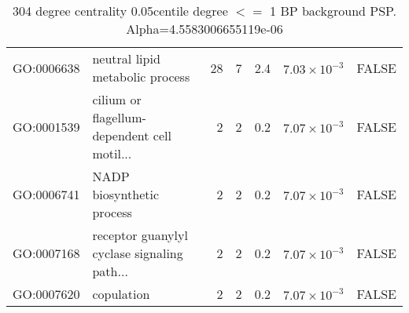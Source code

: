 \begin{table}[ht]
\begin{adjustbox}{max width=\textwidth}
\begin{tabular}{llrrrrl}
  GO:0006638 & neutral lipid metabolic process & 28 & 7 & 2.4 & $7.03 \times 10^{-3}$ & FALSE \\ 
  GO:0001539 & cilium or flagellum-dependent cell motil... & 2 & 2 & 0.2 & $7.07 \times 10^{-3}$ & FALSE \\ 
  GO:0006741 & NADP biosynthetic process & 2 & 2 & 0.2 & $7.07 \times 10^{-3}$ & FALSE \\ 
  GO:0007168 & receptor guanylyl cyclase signaling path... & 2 & 2 & 0.2 & $7.07 \times 10^{-3}$ & FALSE \\ 
  GO:0007620 & copulation & 2 & 2 & 0.2 & $7.07 \times 10^{-3}$ & FALSE \\ 
   \hline
\end{tabular}
\end{adjustbox}
\caption{304 degree centrality 0.05centile degree $<=$ 1 BP background PSP. Alpha=4.5583006655119e-06} 
\label{tab:304 degree centrality 0.05centile  1 BP background PSP. Alpha=4.5583006655119e-06}
\end{table}



